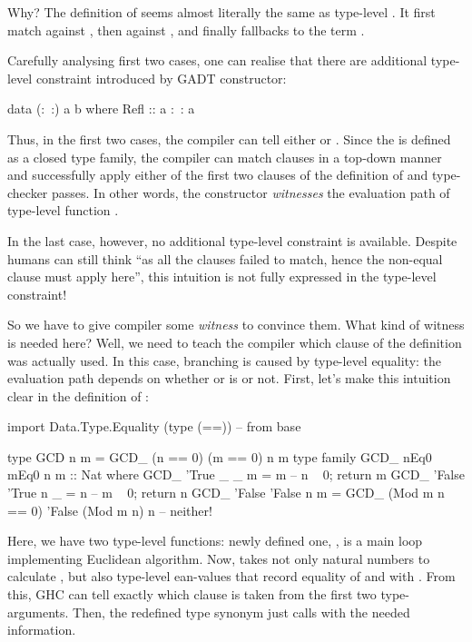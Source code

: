 \documentclass[demotion-paper.tex]{subfiles}
\begin{document}
Why? The definition of  seems almost literally the same as type-level .
It first match  against , then  against , and finally fallbacks to the term .

Carefully analysing first two cases, one can realise that there are additional type-level constraint introduced by  GADT constructor:

\begin{code}
data (:~:) a b where
  Refl :: a :~: a
\end{code}

Thus, in the first two cases, the compiler can tell either  or .
Since the  is defined as a closed type family, the compiler can match clauses in a top-down manner and successfully apply either of the first two clauses of the definition of  and type-checker passes.
In other words, the constructor  \emph{witnesses} the evaluation path of type-level function .

In the last case, however, no additional type-level constraint is available.
Despite humans can still think ``as all the  clauses failed to match, hence the non-equal clause must apply here'', this intuition is not fully expressed in the type-level constraint!

So we have to give compiler some \emph{witness} to convince them.
What kind of witness is needed here?
Well, we need to teach the compiler which clause of the definition was actually used.
In this case, branching is caused by type-level equality: the evaluation path depends on whether  or  is  or not.
First, let's make this intuition clear in the definition of :

\begin{code}
import Data.Type.Equality (type (==)) -- from base

type GCD n m = GCD_ (n == 0) (m == 0) n m
type family GCD_ nEq0 mEq0 n m :: Nat where
  GCD_ 'True  _      _ m = m   -- n ~ 0; return m
  GCD_ 'False 'True  n _ = n   -- m ~ 0; return n
  GCD_ 'False 'False n m = GCD_ (Mod m n == 0) 'False (Mod m n) n  -- neither!
\end{code}

Here, we have two type-level functions: newly defined one, , is a main loop implementing Euclidean algorithm.
Now,  takes not only natural numbers to calculate , but also type-level ean-values that record equality of  and  with .
From this, GHC can tell exactly which clause is taken from the first two type-arguments.
Then, the redefined type synonym  just calls  with the needed information.
\end{document}
